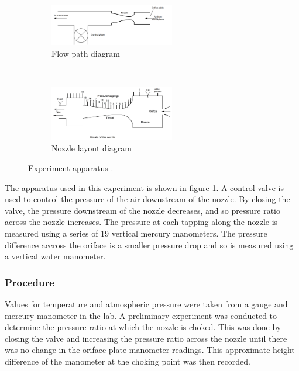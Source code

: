 \documentclass{article}
\begin{document}
\begin{figure}[H]
    \centering
    \begin{subfigure}{0.8\textwidth}
        \centering
        \includegraphics[width=0.6\textwidth]{flow_layout.png}
        \caption{Flow path diagram}
        \label{fig:flow_layout}
    \end{subfigure}
    ~
    \begin{subfigure}{0.8\textwidth}
        \centering
        \includegraphics[width=0.6\textwidth]{../Supersonic_Nozzle/small_nozzle_layout.png}
        \caption{Nozzle layout diagram}
        \label{fig:nozzle_layout}
    \end{subfigure}
    \caption{Experiment apparatus \cite{lab_manual}.}
\end{figure}

The apparatus used in this experiment is shown in figure \ref{fig:flow_layout}.
A control valve is used to control the pressure of the air downstream of the nozzle. By closing the valve, the pressure downstream of the nozzle decreases, and so pressure ratio across the nozzle increases.
The pressure at each tapping along the nozzle is measured using a series of 19 vertical mercury manometers.
The pressure difference accross the oriface is a smaller pressure drop and so is measured using a vertical water manometer.

\subsubsection{Procedure}

Values for temperature and atmospheric pressure were taken from a gauge and mercury manometer in the lab.
A preliminary experiment was conducted to determine the pressure ratio at which the nozzle is choked.
This was done by closing the valve and increasing the pressure ratio across the nozzle until there was no change in the oriface plate manometer readings.
This approximate height difference of the manometer at the choking point was then recorded.
\end{document}
